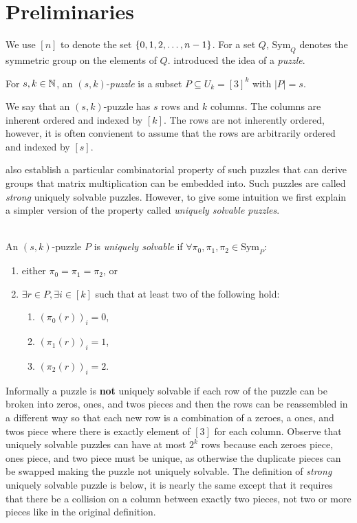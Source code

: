 \documentclass[11pt]{article}
\newcommand\sse{\subseteq}
\newcommand\Sym[1]{\ensuremath{\mathrm{Sym}_{#1}}}
\begin{document}
\section{Preliminaries}
\label{sec:prelim}

\newcommand\ordset[1]{\ensuremath{[#1]}}

We use $\ordset{n}$ to denote the set $\left\{ 0,1,2,\ldots, n-1 \right\}$.  For
a set $Q$, $\Sym{Q}$ denotes the symmetric group on the elements of
$Q$.  \cite{cksu05} introduced the idea of a \emph{puzzle}.

\begin{definition}[Puzzle]
  For $s, k \in \mathbb{N}$, an $(s,k)$-\emph{puzzle} is a
  subset $P \sse U_k = \ordset{3}^k$ with $|P| = s$.
\end{definition}

We say that an $(s,k)$-puzzle has $s$ rows and $k$ columns.  The
columns are inherent ordered and indexed by $\ordset{k}$.  The rows are not
inherently ordered, however, it is often convienent to assume that the
rows are arbitrarily ordered and indexed by $\ordset{s}$.

\cite{cksu05} also establish a particular combinatorial property of
such puzzles that can derive groups that matrix multiplication can be
embedded into.  Such puzzles are called \emph{strong} uniquely
solvable puzzles.  However, to give some intuition we first explain a
simpler version of the property called \emph{uniquely solvable
  puzzles}.

\begin{definition}
  ~\\An $(s,k)$-puzzle $P$ is \emph{uniquely solvable} if
  $\forall \pi_0, \pi_1, \pi_2 \in \Sym{P}:$
  \begin{enumerate}
  \item either $\pi_0 = \pi_1 = \pi_2$, or
  \item $\exists r \in P, \exists i \in \ordset{k}$ such that at least two
    of the following hold:
    \begin{enumerate}
    \item $(\pi_0(r))_i = 0$,
    \item $(\pi_1(r))_i = 1$,
    \item $(\pi_2(r))_i = 2$.
    \end{enumerate}
  \end{enumerate}
\end{definition}

Informally a puzzle is \textbf{not} uniquely solvable if each row of
the puzzle can be broken into zeros, ones, and twos pieces and then
the rows can be reassembled in a different way so that each new row is
a combination of a zeroes, a ones, and twos piece where there is
exactly element of $\ordset{3}$ for each column.  Observe that uniquely
solvable puzzles can have at most $2^k$ rows because each zeroes
piece, ones piece, and two piece must be unique, as otherwise the
duplicate pieces can be swapped making the puzzle not uniquely
solvable.  The definition of \emph{strong} uniquely solvable puzzle is
below, it is nearly the same except that it requires that there be a
collision on a column between exactly two pieces, not two or more
pieces like in the original definition.
\end{document}
